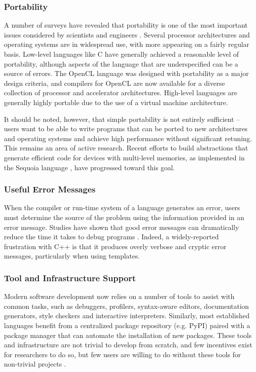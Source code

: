 \documentclass[12pt]{article}
\begin{document}
\subsubsection{Portability}\label{portability}
A number of surveys have revealed that portability is one of the most important issues considered by scientists and engineers \cite{hannay2009scientists}\cite{basili2008understanding}. Several processor architectures and operating systems are in widespread use, with more appearing on a fairly regular basis. Low-level languages like C have generally achieved a reasonable level of portability, although aspects of the language that are underspecified can be a source of errors. The OpenCL language was designed with portability as a major design criteria, and compilers for OpenCL are now available for a diverse collection of processor and accelerator architectures. High-level languages are generally highly portable due to the use of a virtual machine architecture. 

It should be noted, however, that simple portability is not entirely sufficient -- users want to be able to write programs that can be ported to new architectures and operating systems and achieve high performance without significant retuning. This remains an area of active research. Recent efforts to build abstractions that generate efficient code for devices with multi-level memories, as implemented in the Sequoia language \cite{fatahalian2006sequoia}, have  progressed toward this goal.

\subsubsection{Useful Error Messages}\label{errors}
When the compiler or run-time system of a language generates an error, users must determine the source of the problem using the information provided in an error message. Studies have shown that good error messages can dramatically reduce the time it takes to debug programs \cite{marceau2011measuring}. Indeed, a widely-reported frustration with C++ is that it produces overly verbose and cryptic error messages, particularly when using templates.

\subsubsection{Tool and Infrastructure Support}\label{tools}
Modern software development now relies on a number of tools to assist with common tasks, such as debuggers,  profilers, syntax-aware editors, documentation generators, style checkers and interactive interpreters. Similarly, most established languages benefit from a centralized package repository (e.g. PyPI) paired with a package manager that can automate the installation of new packages. These tools and infrastructure are not trivial to develop from scratch, and few incentives exist for researchers to do so, but few users are willing to do without these tools for non-trivial projects \cite{squires2005programmers}.
\end{document}

